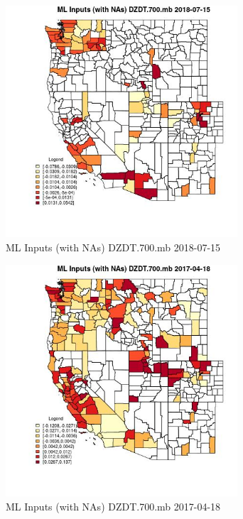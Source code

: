 \begin{figure} 
\centering  
\includegraphics[width=0.77\textwidth]{Code_Outputs/Report_ML_input_PM25_Step4_part_e_de_duplicated_aves_compiled_2019-05-21wNAs_CountyDZDT700mbMean2018-07-15.jpg} 
\caption{\label{fig:Report_ML_input_PM25_Step4_part_e_de_duplicated_aves_compiled_2019-05-21wNAsCountyDZDT700mbMean2018-07-15}ML Inputs (with NAs) DZDT.700.mb 2018-07-15} 
\end{figure} 
 

\begin{figure} 
\centering  
\includegraphics[width=0.77\textwidth]{Code_Outputs/Report_ML_input_PM25_Step4_part_e_de_duplicated_aves_compiled_2019-05-21wNAs_CountyDZDT700mbMean2017-04-18.jpg} 
\caption{\label{fig:Report_ML_input_PM25_Step4_part_e_de_duplicated_aves_compiled_2019-05-21wNAsCountyDZDT700mbMean2017-04-18}ML Inputs (with NAs) DZDT.700.mb 2017-04-18} 
\end{figure} 
 

